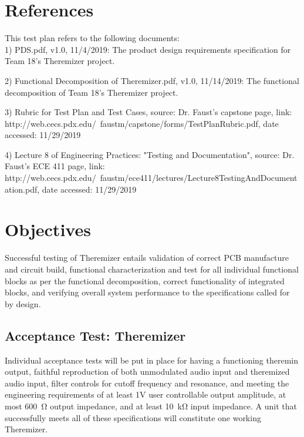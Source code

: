 \documentclass[a4paper,12pt]{article}
\begin{document}


\newpage
\tableofcontents


\newpage
{}
	\section{References}
    This test plan refers to the following documents:\\
    
    1) PDS.pdf, v1.0, 11/4/2019: The product design requirements specification for Team 18's 
    Theremizer project.
    
    2) Functional Decomposition of Theremizer.pdf, v1.0, 11/14/2019: The functional decomposition of Team 18's Theremizer project.
    
    3) Rubric for Test Plan and Test Cases, source: Dr. Faust's capstone page, link: http://web.cecs.pdx.edu/~faustm/capstone/forms/TestPlanRubric.pdf, date accessed: 11/29/2019
    
    4) Lecture 8 of Engineering Practices: "Testing and Documentation", source: Dr. Faust's ECE 411 page, link: http://web.cecs.pdx.edu/~faustm/ece411/lectures/Lecture8TestingAndDocumentation.pdf, date accessed: 11/29/2019
	\section{Objectives}
	Successful testing of Theremizer entails validation of correct PCB manufacture and circuit build,
    functional characterization and test for all individual functional blocks as per the functional 
    decomposition, correct functionality of integrated blocks, and verifying overall system performance 
    to the specifications called for by design.
	\subsection{Acceptance Test: Theremizer}
	Individual acceptance tests will be put in place for having a functioning theremin output, faithful reproduction of both unmodulated audio input and theremized audio input, filter controls for cutoff frequency and resonance, and meeting the engineering requirements of at least 1V user controllable output amplitude, at most \SI{600}{\ohm} output impedance, and at least \SI{10}{\kilo\ohm} input impedance. A unit that successfully meets all of these specifications will constitute one working Theremizer.
\end{document}
